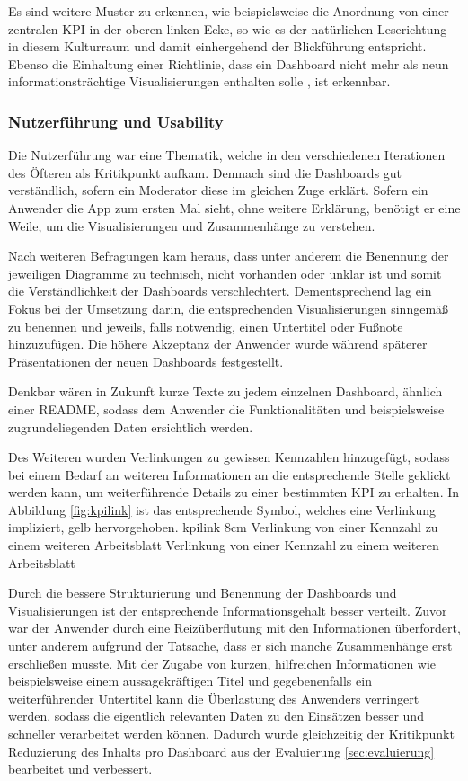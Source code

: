 Es sind weitere Muster zu erkennen, wie beispielsweise die Anordnung von einer zentralen \gls{KPI} in der oberen linken Ecke, so wie es der natürlichen Leserichtung in diesem Kulturraum und damit einhergehend der Blickführung entspricht.
Ebenso die Einhaltung einer Richtlinie, dass ein Dashboard nicht mehr als neun informationsträchtige Visualisierungen enthalten solle \cite[5.3]{Kertzel.2018}, ist erkennbar.

\subsubsection{Nutzerführung und Usability}
Die Nutzerführung war eine Thematik, welche in den verschiedenen Iterationen des Öfteren als Kritikpunkt aufkam.
Demnach sind die Dashboards gut verständlich, sofern ein Moderator diese im gleichen Zuge erklärt.
Sofern ein Anwender die App zum ersten Mal sieht, ohne weitere Erklärung, benötigt er eine Weile, um die Visualisierungen und Zusammenhänge zu verstehen.

Nach weiteren Befragungen kam heraus, dass unter anderem die Benennung der jeweiligen Diagramme zu technisch, nicht vorhanden oder unklar ist und somit die Verständlichkeit der Dashboards verschlechtert. 
Dementsprechend lag ein Fokus bei der Umsetzung darin, die entsprechenden Visualisierungen sinngemäß zu benennen und jeweils, falls notwendig, einen Untertitel oder Fußnote hinzuzufügen.
Die höhere Akzeptanz der Anwender wurde während späterer Präsentationen der neuen Dashboards festgestellt. 

Denkbar wären in Zukunft kurze Texte zu jedem einzelnen Dashboard, ähnlich einer \glqq README\grqq{}, sodass dem Anwender die Funktionalitäten und beispielsweise zugrundeliegenden Daten ersichtlich werden.

Des Weiteren wurden Verlinkungen zu gewissen Kennzahlen hinzugefügt, sodass bei einem Bedarf an weiteren Informationen an die entsprechende Stelle geklickt werden kann, um weiterführende Details zu einer bestimmten  \gls{KPI} zu erhalten.
In Abbildung \ref{fig:kpilink} ist das entsprechende Symbol, welches eine Verlinkung impliziert, gelb hervorgehoben.
\bild
{kpilink}
{8cm}
{Verlinkung von einer Kennzahl zu einem weiteren Arbeitsblatt}
{Verlinkung von einer Kennzahl zu einem weiteren Arbeitsblatt}

Durch die bessere Strukturierung und Benennung der Dashboards und Visualisierungen ist der entsprechende Informationsgehalt besser verteilt.
Zuvor war der Anwender durch eine Reizüberflutung mit den Informationen überfordert, unter anderem aufgrund der Tatsache, dass er sich manche Zusammenhänge erst erschließen musste.
Mit der Zugabe von kurzen, hilfreichen Informationen wie beispielsweise einem aussagekräftigen Titel und gegebenenfalls ein weiterführender Untertitel kann die Überlastung des Anwenders verringert werden, sodass die eigentlich relevanten Daten zu den Einsätzen besser und schneller verarbeitet werden können.
Dadurch wurde gleichzeitig der Kritikpunkt \glqq Reduzierung des Inhalts pro Dashboard\grqq{} aus der Evaluierung \ref{sec:evaluierung} bearbeitet und verbessert.

